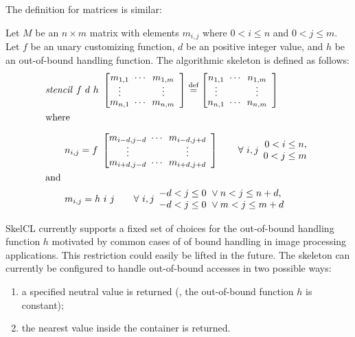 \noindent
The definition for matrices is similar:
\begin{definition}
  \label{definition:mapoverlap:matrix}
  Let $M$ be an $n\times m$ matrix with elements $m_{i,j}$ where $0 < i \leq n$ and $0 < j \leq m$.
  Let $f$ be an unary customizing function, $d$ be an positive integer value, and $h$ be an out-of-bound handling function.
  The algorithmic skeleton \stencil is defined as follows:
  \begin{equation*}
    \begin{split}
    & \stencil\ f\  d\ h\ \DottedMatrix{m_{1,1}}{m_{1,m}}{m_{n,1}}{m_{n,m}}
               \eqdef \DottedMatrix{n_{1,1}}{n_{1,m}}{n_{n,1}}{n_{n,m}}\\
               &\text{where}\\[.5em]
    &\qquad n_{i,j} = f\ \DottedMatrix{m_{i-d,j-d}}{m_{i-d,j+d}}{m_{i+d,j-d}}{m_{i+d,j+d}} \qquad \forall\ i,j
        \begin{array}{r} 0 < i \leq n,\\ 0 < j \leq m \end{array}\\
        &\text{and}\\
    &\qquad m_{i,j} = h\ i\ j \qquad \forall\ i,j \begin{array}{l} -d < j \leq 0\ \vee n < j \leq n+d,\\ -d < j \leq 0\ \vee m < j \leq m+d \end{array}
    \end{split}
  \end{equation*}
\end{definition}


SkelCL currently supports a fixed set of choices for the out-of-bound handling function $h$ motivated by common cases of of bound handling in image processing applications.
This restriction could easily be lifted in the future.
The \stencil skeleton can currently be configured to handle out-of-bound accesses in two possible ways:
\begin{enumerate}
  \item a specified neutral value is returned (\ie, the out-of-bound function $h$ is constant);
  \item the nearest value inside the container is returned.
\end{enumerate}

